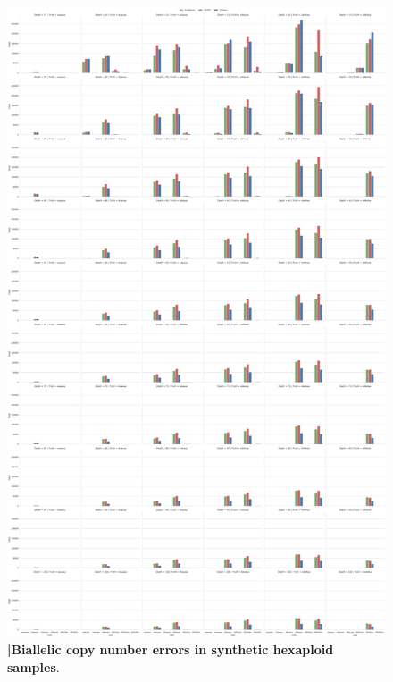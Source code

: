 \documentclass{article}
\begin{document}
\begin{figure}[ht!]
    \centering
    \includegraphics[height=0.95\textheight]{figures/hexaploid_biallelic_copy_errors}
    \caption{\textbf{|\:Biallelic copy number errors in synthetic hexaploid samples}.}
    \label{supfig:hexaploid_biallelic_copy_errors}
\end{figure}

\clearpage
\end{document}
